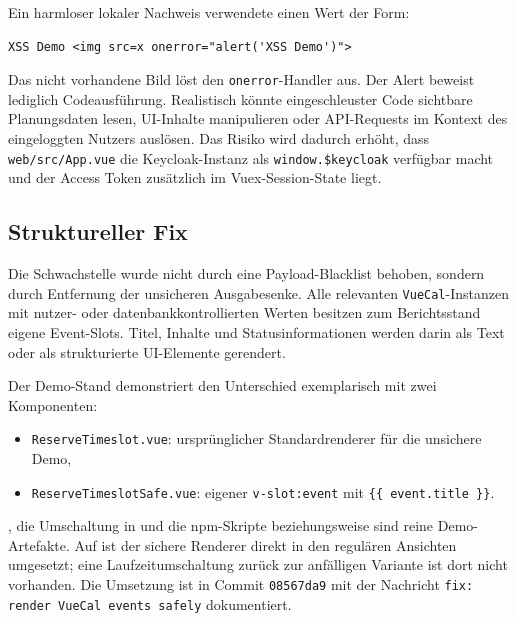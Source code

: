 Ein harmloser lokaler Nachweis verwendete einen Wert der Form:

\begin{lstlisting}[caption={Lokaler XSS-Demo-Payload}]
XSS Demo <img src=x onerror="alert('XSS Demo')">
\end{lstlisting}

Das nicht vorhandene Bild löst den \texttt{onerror}-Handler aus. Der
Alert beweist lediglich Codeausführung. Realistisch könnte
eingeschleuster Code sichtbare Planungsdaten lesen, UI-Inhalte
manipulieren oder API-Requests im Kontext des eingeloggten Nutzers
auslösen. Das Risiko wird dadurch erhöht, dass
\texttt{web/src/App.vue} die Keycloak-Instanz als
\texttt{window.\$keycloak} verfügbar macht und der Access Token
zusätzlich im Vuex-Session-State liegt.

\subsection{Struktureller Fix}

Die Schwachstelle wurde nicht durch eine Payload-Blacklist behoben,
sondern durch Entfernung der unsicheren Ausgabesenke. Alle relevanten
\texttt{VueCal}-Instanzen mit nutzer- oder datenbankkontrollierten
Werten besitzen zum Berichtsstand eigene Event-Slots. Titel, Inhalte
und Statusinformationen werden darin als Text oder als strukturierte
UI-Elemente gerendert.

Der Demo-Stand 
demonstriert den Unterschied exemplarisch mit zwei Komponenten:

\begin{itemize}
  \item \texttt{ReserveTimeslot.vue}: ursprünglicher Standardrenderer
    für die unsichere Demo,
  \item \texttt{ReserveTimeslotSafe.vue}: eigener
    \texttt{v-slot:event} mit \texttt{\{\{ event.title \}\}}.
\end{itemize}

, die Umschaltung in 
und die npm-Skripte  beziehungsweise
 sind reine Demo-Artefakte. Auf
 ist der sichere Renderer direkt
in den regulären Ansichten umgesetzt; eine Laufzeitumschaltung zurück
zur anfälligen Variante ist dort nicht vorhanden. Die Umsetzung ist in
Commit \texttt{08567da9} mit der Nachricht
\texttt{fix: render VueCal events safely} dokumentiert.

